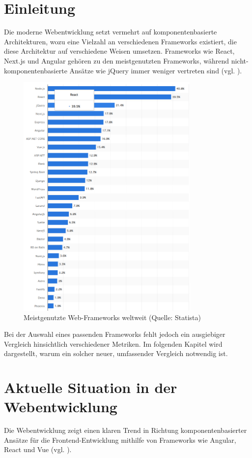 \documentclass[oneside]{ausarbeitung}
\begin{document}
\section{Einleitung}
Die moderne Webentwicklung setzt vermehrt auf komponentenbasierte Architekturen, wozu eine Vielzahl an verschiedenen Frameworks existiert, die diese Architektur auf verschiedene Weisen umsetzen. Frameworks wie React, Next.js und Angular gehören zu den meistgenutzten Frameworks, während nicht-komponentenbasierte Ansätze wie jQuery immer weniger vertreten sind (vgl. \parencite{statista2024}).
\begin{figure}[h]
    \centering
    \includegraphics[width=0.8\textwidth, height=0.5\textheight, keepaspectratio]{images/web-frameworks.png}
    \caption{Meistgenutzte Web-Frameworks weltweit (Quelle: Statista)}
    \label{fig:frameworks}
\end{figure}

Bei der Auswahl eines passenden Frameworks fehlt jedoch ein ausgiebiger Vergleich hinsichtlich verschiedener Metriken. Im folgenden Kapitel wird dargestellt, warum ein solcher neuer, umfassender Vergleich notwendig ist.

\section{Aktuelle Situation in der Webentwicklung}
Die Webentwicklung zeigt einen klaren Trend in Richtung komponentenbasierter Ansätze für die Frontend-Entwicklung mithilfe von Frameworks wie Angular, React und Vue (vgl. \parencite[S. 44]{js-framework-comparison}). 
\end{document}
